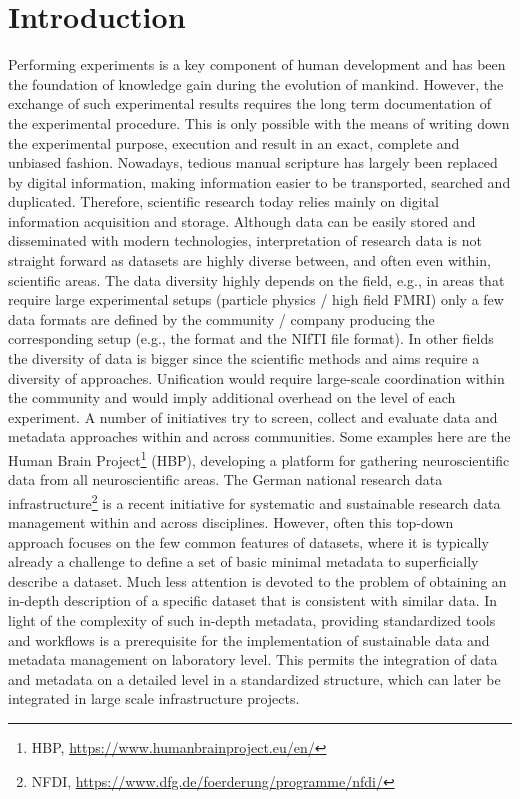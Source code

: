 \clearpage
\chapter{Introduction}
\label{sec:intro}
Performing experiments is a key component of human development and has been the foundation of knowledge gain during the evolution of mankind. However, the exchange of such experimental results requires the long term documentation of the  experimental procedure. This is only possible with the means of writing down the experimental purpose, execution and result in an exact, complete and unbiased fashion. Nowadays, tedious manual scripture has largely been replaced by digital information, making information easier to be transported, searched and duplicated. Therefore, scientific research today relies mainly on digital information acquisition and storage. Although data can be easily stored and disseminated with modern technologies, interpretation of research data is not straight forward as datasets are highly diverse between, and often even within, scientific areas. The data diversity highly depends on the field, e.g., in areas that require large experimental setups (particle physics / high field FMRI) only a few data formats are defined by the community / company producing the corresponding setup (e.g., the  format \citep{Brun_1996} and the NIfTI file format). In other fields the diversity of data is bigger since the scientific methods and aims require a diversity of approaches. Unification would require large-scale coordination within the community and  would imply additional overhead on the level of each experiment. A number of initiatives try to screen, collect and evaluate data and metadata approaches within and across communities. Some examples here are the Human Brain Project\footnote{HBP, \url{https://www.humanbrainproject.eu/en/}} (HBP), developing a platform for gathering neuroscientific data from all neuroscientific areas. The German national research data infrastructure\footnote{NFDI, \url{https://www.dfg.de/foerderung/programme/nfdi/}} is a recent initiative for systematic and sustainable research data management within and across disciplines. However, often this top-down approach focuses on the few common features of datasets, where it is typically already a challenge to define a set of basic minimal metadata to superficially describe a dataset. Much less attention is devoted to the problem of obtaining an in-depth description of a specific dataset that is consistent with similar data. In light of the complexity of such in-depth metadata, providing standardized tools and workflows is a prerequisite for the implementation of sustainable data and metadata management on laboratory level. This permits the integration of data and metadata on a detailed level in a standardized structure, which can later be integrated in large scale infrastructure projects.\\

